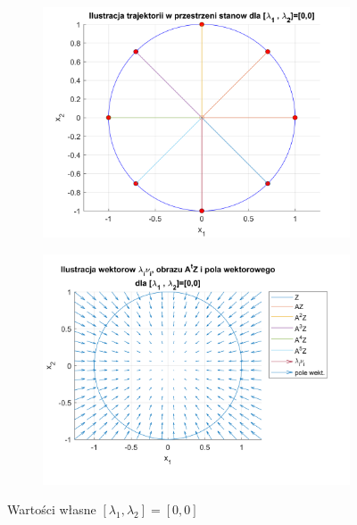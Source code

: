 \documentclass{article}
\begin{document}
\begin{figure}[H]
    \centering
    \begin{subfigure}{0.44\textwidth}
        \includegraphics[width=\textwidth]{portret_fazowy_0_0.png}
    \end{subfigure}
    \begin{subfigure}{0.48\textwidth}
        \includegraphics[width=\textwidth]{pole_wektorowe_0_0.png}
    \end{subfigure}
    \caption{Warto\'sci własne $[ \lambda_1, \lambda_2 ]= [ 0, 0 ]$}
    \label{fig::0i0}
\end{figure}
\end{document}
